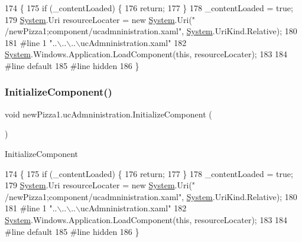 \begin{DoxyCode}
174                                           \{
175             \textcolor{keywordflow}{if} (\_contentLoaded) \{
176                 \textcolor{keywordflow}{return};
177             \}
178             \_contentLoaded = \textcolor{keyword}{true};
179             \hyperlink{namespaceSystem}{System}.Uri resourceLocater = \textcolor{keyword}{new} \hyperlink{namespaceSystem}{System}.Uri(\textcolor{stringliteral}{"
      /newPizza1;component/ucadmninistration.xaml"}, \hyperlink{namespaceSystem}{System}.UriKind.Relative);
180             
181 \textcolor{preprocessor}{            #line 1 "..\(\backslash\)..\(\backslash\)..\(\backslash\)ucAdmninistration.xaml"}
182             \hyperlink{namespaceSystem}{System}.Windows.Application.LoadComponent(\textcolor{keyword}{this}, resourceLocater);
183             
184 \textcolor{preprocessor}{            #line default}
185 \textcolor{preprocessor}{            #line hidden}
186         \}
\end{DoxyCode}
\mbox{\label{classnewPizza1_1_1ucAdmninistration_a500966f5d66cf50194a823a88df8517e}} 
\subsubsection{\texorpdfstring{Initialize\+Component()}{InitializeComponent()}\hspace{0.1cm}{\footnotesize\ttfamily [5/5]}}
{\footnotesize\ttfamily void new\+Pizza1.\+uc\+Admninistration.\+Initialize\+Component (\begin{DoxyParamCaption}{ }\end{DoxyParamCaption})\hspace{0.3cm}{\ttfamily [inline]}}



Initialize\+Component 


\begin{DoxyCode}
174                                           \{
175             \textcolor{keywordflow}{if} (\_contentLoaded) \{
176                 \textcolor{keywordflow}{return};
177             \}
178             \_contentLoaded = \textcolor{keyword}{true};
179             \hyperlink{namespaceSystem}{System}.Uri resourceLocater = \textcolor{keyword}{new} \hyperlink{namespaceSystem}{System}.Uri(\textcolor{stringliteral}{"
      /newPizza1;component/ucadmninistration.xaml"}, \hyperlink{namespaceSystem}{System}.UriKind.Relative);
180             
181 \textcolor{preprocessor}{            #line 1 "..\(\backslash\)..\(\backslash\)..\(\backslash\)ucAdmninistration.xaml"}
182             \hyperlink{namespaceSystem}{System}.Windows.Application.LoadComponent(\textcolor{keyword}{this}, resourceLocater);
183             
184 \textcolor{preprocessor}{            #line default}
185 \textcolor{preprocessor}{            #line hidden}
186         \}
\end{DoxyCode}


